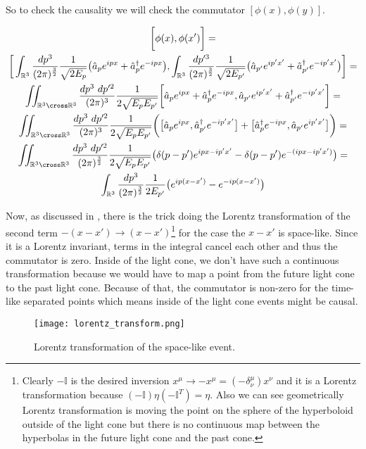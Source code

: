 So to check the causality we will check the commutator $[\phi(x), \phi(y)]$.

\begin{equation*}
    \begin{gathered}
        \bigg[\phi(x), \phi(x')\bigg] = \\
        \bigg[
            \int_{\mathbb{R}^{3}} \frac{dp^{3}}{(2 \pi)^{\frac{3}{2}}} \frac{1}{\sqrt{2 E_{p}}} \big(\hat{a}_{p} e^{ipx} + \hat{a}^{\dagger}_{p} e^{-ipx}\big),
            \int_{\mathbb{R}^{3}} \frac{dp'^{3}}{(2 \pi)^{\frac{3}{2}}} \frac{1}{\sqrt{2 E_{p'}}} \big(\hat{a}_{p'} e^{ip'x'} + \hat{a}^{\dagger}_{p'} e^{-ip'x'}\big)
        \bigg] = \\
        \iint_{\mathbb{R}^{3} \cross \mathbb{R}^{3}} \frac{dp^{3} \ dp'^{2}}{(2 \pi)^{3}} \frac{1}{2 \sqrt{E_{p} E_{p'}}}
        \bigg[
            \hat{a}_{p} e^{ipx} + \hat{a}^{\dagger}_{p} e^{-ipx},
            \hat{a}_{p'} e^{ip'x'} + \hat{a}^{\dagger}_{p'} e^{-ip'x'}
        \bigg] = \\
        \iint_{\mathbb{R}^{3} \cross \mathbb{R}^{3}} \frac{dp^{3} \ dp'^{2}}{(2 \pi)^{3}} \frac{1}{2 \sqrt{E_{p} E_{p'}}}
        \bigg(
            \big[\hat{a}_{p} e^{ipx}, \hat{a}^{\dagger}_{p'} e^{-ip'x'}\big] + \big[\hat{a}^{\dagger}_{p} e^{-ipx}, \hat{a}_{p'} e^{ip'x'}\big]
        \bigg) = \\
        \iint_{\mathbb{R}^{3} \cross \mathbb{R}^{3}} \frac{dp^{3} \ dp'^{2}}{(2 \pi)^{\frac{3}{2}}} \frac{1}{2 \sqrt{E_{p} E_{p'}}}
        \big(\delta(p - p') e^{ipx - ip'x'} - \delta(p - p') e^{-(ipx - ip'x')} \big) = \\
        \int_{\mathbb{R}^{3}} \frac{dp^{3}}{(2 \pi)^{\frac{3}{2}}} \frac{1}{2 E_{p'}} \big(e^{ip(x - x')} - e^{-ip(x - x')} \big)
    \end{gathered}
\end{equation*}

Now, as discussed in \cite{peskin_schroeder}, there is the trick doing the Lorentz transformation of the second term $-(x - x') \to (x - x')$\footnote{Clearly $-\mathbb{I}$ 
is the desired inversion $x^{\mu} \to -x^{\mu} = (-\delta^{\mu}_{\nu}) x^{\nu}$ and it is a Lorentz transformation because $(-\mathbb{I}) \eta 
(-\mathbb{I}^{T}) = \eta$. Also we can see geometrically Lorentz transformation is moving the point on the sphere of the hyperboloid outside of the
light cone but there is no continuous map between the hyperbolas in the future light cone and the past cone.} for the case the $x - x'$ is space-like. Since it
is a Lorentz invariant, terms in the integral cancel each other and thus the commutator is zero. Inside of the light cone, we don't have such a continuous transformation
because we would have to map a point from the future light cone to the past light cone. Because of that, the commutator is non-zero for the time-like separated points which means 
inside of the light cone events might be causal.

\begin{figure}[H]
    \centering
    \texttt{[image: lorentz\_transform.png]}
    \caption{Lorentz transformation of the space-like event.}
    \label{fig:lorentz_transform}
\end{figure}

